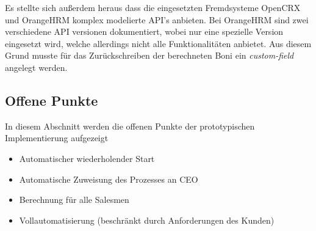 \documentclass[]{article}
\begin{document}
Es stellte sich außerdem heraus dass die eingesetzten Fremdsysteme OpenCRX und OrangeHRM komplex modelierte API's anbieten. Bei OrangeHRM sind zwei verschiedene API versionen dokumentiert, wobei nur eine spezielle Version eingesetzt wird, welche allerdings nicht alle Funktionalitäten anbietet. Aus diesem Grund musste für das Zurückschreiben der berechneten Boni ein \emph{custom-field} angelegt werden.
\subsection{Offene Punkte}
In diesem Abschnitt werden die offenen Punkte der prototypischen Implementierung aufgezeigt
\begin{itemize}
	\item Automatischer wiederholender Start
	\item Automatische Zuweisung des Prozesses an CEO
	\item Berechnung für alle Salesmen
	\item Vollautomatisierung (beschränkt durch Anforderungen des Kunden)
\end{itemize}
\end{document}
